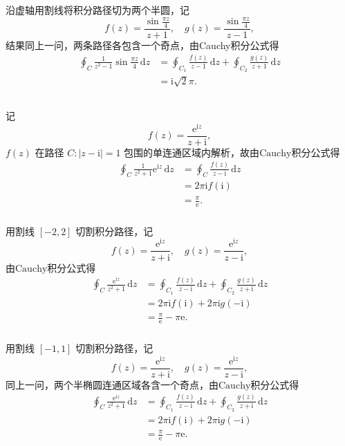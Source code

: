 \documentclass[12pt]{article}
\begin{document}
\subsubsection{}
沿虚轴用割线将积分路径切为两个半圆，记\[f(z) = \frac{\sin \frac{\pi z}{4}}{z+1}, \quad g(z) = \frac{\sin \frac{\pi z}{4}}{z-1},\]
结果同上一问，两条路径各包含一个奇点，由Cauchy积分公式得
\begin{align*}
\oint_{C} \frac{1}{z^2 - 1} \sin \frac{\pi z}{4} \,\mathrm{d}z &= \oint_{C_1} \frac{f(z)}{z - 1} \,\mathrm{d}z + \oint_{C_2} \frac{g(z)}{z + 1} \,\mathrm{d}z \\
&= \mathrm{i} \sqrt{2} \pi.
\end{align*}
\subsection{}
\subsubsection{}
记\[f(z) = \frac{\mathrm{e}^{\mathrm{i} z}}{z + \mathrm{i}},\]$f(z)$ 在路径 $C: \vert z - \mathrm{i} \vert = 1$ 包围的单连通区域内解析，故由$\mathrm{Cauchy}$积分公式得
\begin{align*}
\oint_{C} \frac{1}{z^2 + 1} \mathrm{e}^{\mathrm{i} z} \,\mathrm{d}z &= \oint_{C} \frac{f(z)}{z - \mathrm{i}} \,\mathrm{d}z \\
&= 2\pi \mathrm{i} f(\mathrm{i}) \\
&= \frac{\pi}{\mathrm{e}}.
\end{align*}
\subsubsection{}
用割线 $[-2, 2]$ 切割积分路径，记\[f(z) = \frac{\mathrm{e}^{\mathrm{i} z}}{z + \mathrm{i}},\quad g(z) = \frac{\mathrm{e}^{\mathrm{i} z}}{z - \mathrm{i}},\]
由$\mathrm{Cauchy}$积分公式得
\begin{align*}
\oint_{C} \frac{\mathrm{e}^{\mathrm{i} z}}{z^2 + 1} \,\mathrm{d}z &= \oint_{C_1} \frac{f(z)}{z - \mathrm{i}} \,\mathrm{d}z + \oint_{C_2} \frac{g(z)}{z + \mathrm{i}} \,\mathrm{d}z \\
&= 2\pi \mathrm{i} f(\mathrm{i}) + 2\pi \mathrm{i} g(-\mathrm{i}) \\
&= \frac{\pi}{\mathrm{e}} - \pi \mathrm{e}.
\end{align*}
\subsubsection{}
用割线 $[- 1, 1]$ 切割积分路径，记\[f(z) = \frac{\mathrm{e}^{\mathrm{i} z}}{z + \mathrm{i}},\quad g(z) = \frac{\mathrm{e}^{\mathrm{i} z}}{z - \mathrm{i}},\]
同上一问，两个半椭圆连通区域各含一个奇点，由$\mathrm{Cauchy}$积分公式得
\begin{align*}
\oint_{C} \frac{\mathrm{e}^{\mathrm{i} z}}{z^2 + 1} \,\mathrm{d}z &= \oint_{C_1} \frac{f(z)}{z - \mathrm{i}} \,\mathrm{d}z + \oint_{C_2} \frac{g(z)}{z + \mathrm{i}} \,\mathrm{d}z \\
&= 2\pi \mathrm{i} f(\mathrm{i}) + 2\pi \mathrm{i} g(-\mathrm{i}) \\
&= \frac{\pi}{\mathrm{e}} - \pi \mathrm{e}.
\end{align*}
\end{document}
